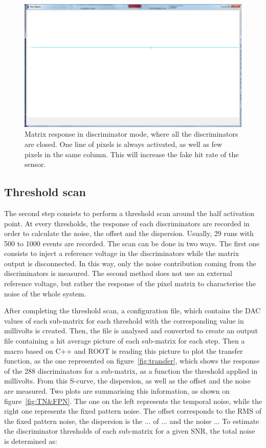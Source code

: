   \begin{figure}[!h]
    \centering
    \includegraphics[width=\textwidth]{Pictures/labTests/th255.png}
    \caption{Matrix response in discriminator mode, where all the discriminators are closed. One line of pixels is always activated, as well as few pixels in the same column. This will increase the fake hit rate of the sensor.}
    \label{fig:closePixel}
  \end{figure}

  \subsection{Threshold scan}
  The second step consists to perform a threshold scan around the half activation point.
  At every thresholds, the response of each discriminators are recorded in order to calculate the noise, the offset and the dispersion.
  Usually, 29 runs with 500 to 1000 events are recorded.
  The scan can be done in two ways.
  The first one consists to inject a reference voltage in the discriminators while the matrix output is disconnected.
  In this way, only the noise contribution coming from the discriminators is measured.
  The second method does not use an external reference voltage, but rather the response of the pixel matrix to characterise the noise of the whole system.

  After completing the threshold scan, a configuration file, which contains the DAC values of each sub-matrix for each threshold with the corresponding value in millivolts is created.
  Then, the file is analysed and converted to create an output file containing a hit average picture of each sub-matrix for each step.
  Then a macro based on C++ and ROOT is reading this picture to plot the transfer function, as the one represented on figure~\ref{fig:transfer}, which shows the response of the 288 discriminators for a sub-matrix, as a function the threshold applied in millivolts.
  From this S-curve, the dispersion, as well as the offset and the noise are measured.
  Two plots are summarising this information, as shown on figure~\ref{fig:TN&FPN}.
  The one on the left represents the temporal noise, while the right one represents the fixed pattern noise.
  The offset corresponds to the RMS of the fixed pattern noise, the dispersion is the ... of ... and the noise ...
  To estimate the discriminator thresholds of each sub-matrix for a given \gls{SNR}, the total noise is determined as:
  
